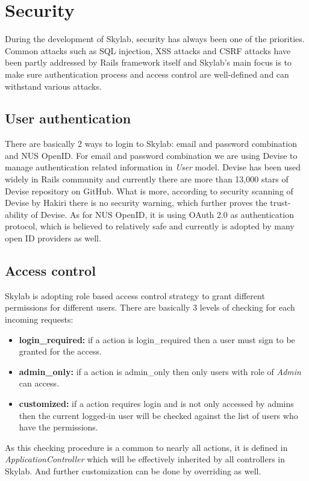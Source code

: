 \chapter{Security}

During the development of Skylab, security has always been one of the priorities. Common attacks such as SQL injection, XSS attacks and CSRF attacks have been partly addressed by Rails framework itself and Skylab's main focus is to make sure authentication process and access control are well-defined and can withstand various attacks.

\section{User authentication}

There are basically 2 ways to login to Skylab: email and password combination and NUS OpenID. For email and password combination we are using Devise to manage authentication related information in \textit{User} model. Devise has been used widely in Rails community and currently there are more than 13,000 stars of Devise repository on GitHub\cite{citation13}. What is more, according to security scanning of Devise by Hakiri there is no security warning, which further proves the trust-ability of Devise\cite{citation13}. As for NUS OpenID, it is using OAuth 2.0 as authentication protocol, which is believed to relatively safe and currently is adopted by many open ID providers as well\cite{citation14}.

\section{Access control}

Skylab is adopting role based access control strategy to grant different permissions for different users. There are basically 3 levels of checking for each incoming requests:

\begin{itemize}
  \item \textbf{login\_required:} if a action is login\_required then a user must sign to be granted for the access.
  \item \textbf{admin\_only:} if a action is admin\_only then only users with role of \textit{Admin} can access.
  \item \textbf{customized:} if a action requires login and is not only accessed by admins then the current logged-in user will be checked against the list of users who have the permissions.
\end{itemize}

As this checking procedure is a common to nearly all actions, it is defined in \textit{ApplicationController} which will be effectively inherited by all controllers in Skylab. And further customization can be done by overriding as well.
